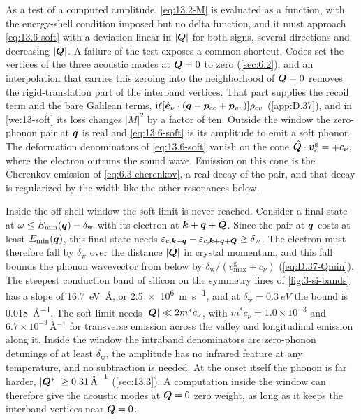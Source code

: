 As a test of a computed amplitude, \cref{eq:13.2-M} is evaluated as a function, with the energy-shell condition imposed but no delta function, and it must approach \cref{eq:13.6-soft} with a deviation linear in $|\bm{Q}|$ for both signs, several directions and decreasing $|\bm{Q}|$. A failure of the test exposes a common shortcut. Codes set the vertices of the three acoustic modes at $\bm{Q} = 0$ to zero (\cref{sec:6.2}), and an interpolation that carries this zeroing into the neighborhood of $\bm{Q} = 0$ removes the rigid-translation part of the interband vertices. That part supplies the recoil term and the bare Galilean terms, $\mathrm{i}\ell[\hat{\bm{e}}_\nu\cdot(\bm{q} - \bm{p}_{cc} + \bm{p}_{vv})]\rho_{cv}$ (\cref{app:D.37}), and in \cref{we:13-soft} its loss changes $|M|^2$ by a factor of ten. Outside the window the zero-phonon pair at $\bm{q}$ is real and \cref{eq:13.6-soft} is its amplitude to emit a soft phonon. The deformation denominators of \cref{eq:13.6-soft} vanish on the cone $\hat{\bm{Q}}\cdot\bm{v}^{\mathrm{g}}_c = \mp c_\nu$, where the electron outruns the sound wave. Emission on this cone is the Cherenkov emission of \cref{eq:6.3-cherenkov}, a real decay of the pair, and that decay is regularized by the width like the other resonances below.

Inside the off-shell window the soft limit is never reached. Consider a final state at $\omega \le E_{\mathrm{min}}(\bm{q}) - \delta_{\mathrm{w}}$ with its electron at $\bm{k}+\bm{q}+\bm{Q}$. Since the pair at $\bm{q}$ costs at least $E_{\mathrm{min}}(\bm{q})$, this final state needs $\varepsilon_{c,\bm{k}+\bm{q}} - \varepsilon_{c,\bm{k}+\bm{q}+\bm{Q}} \ge \delta_{\mathrm{w}}$. The electron must therefore fall by $\delta_{\mathrm{w}}$ over the distance $|\bm{Q}|$ in crystal momentum, and this fall bounds the phonon wavevector from below by $\delta_{\mathrm{w}}/(v^{\mathrm{g}}_{\max} + c_\nu)$ (\cref{eq:D.37-Qmin}). The steepest conduction band of silicon on the symmetry lines of \cref{fig:3-si-bands} has a slope of \SI{16.7}{eV.\angstrom}, or \SI{2.5e6}{m.s^{-1}}, and at $\delta_{\mathrm{w}} = \SI{0.3}{eV}$ the bound is \SI{0.018}{\angstrom^{-1}}. The soft limit needs $|\bm{Q}| \ll 2m^*c_\nu$, with $m^*c_\nu = 1.0\times10^{-3}$ and $6.7\times10^{-3}\,\si{\angstrom^{-1}}$ for transverse emission across the valley and longitudinal emission along it. Inside the window the intraband denominators are zero-phonon detunings of at least $\delta_{\mathrm{w}}$, the amplitude has no infrared feature at any temperature, and no subtraction is needed. At the onset itself the phonon is far harder, $|\bm{Q}^*| \ge \SI{0.31}{\angstrom^{-1}}$ (\cref{sec:13.3}). A computation inside the window can therefore give the acoustic modes at $\bm{Q} = 0$ zero weight, as long as it keeps the interband vertices near $\bm{Q} = 0$.

